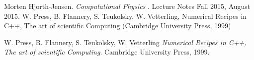 \documentclass[10pt]{article}
\begin{document}
\newpage
\begin{thebibliography}{2}
Morten Hjorth-Jensen. 
\textit{Computational Physics
}. 
Lecture Notes Fall 2015, August 2015.
 W. Press, B. Flannery, S. Teukolsky, W. Vetterling, Numerical Recipes in C++, The art of scientific Computing (Cambridge University Press, 1999)

W. Press, B. Flannery, S. Teukolsky, W. Vetterling 
\textit{Numerical Recipes in C++, The art of scientific Computing}. 
Cambridge University Press, 1999.
 
\end{thebibliography}
\end{document}
